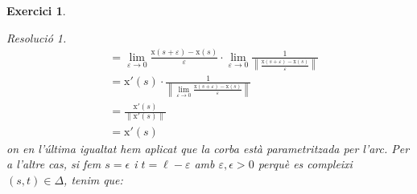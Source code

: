 \documentclass[10pt,a4paper]{article}
\newcommand{\vf}[1]{\boldsymbol{\mathrm{#1}}} %
\newtheorem{exercice}{Exercici}
\theoremstyle{remark}
\newtheorem*{resolution}{Resolució}
\theoremstyle{math}
\begin{document}
\begin{exercice}
\begin{enumerate}
\begin{resolution}
\begin{align*}
                                     & =\lim_{\varepsilon\to 0}\frac{\vf{x}(s+\varepsilon)-\vf{x}(s)}{\varepsilon}\cdot\lim_{\varepsilon\to 0}\frac{1}{\left\|\frac{\vf{x}(s+\varepsilon)-\vf{x}(s)}{\varepsilon}\right\|} \\
                                     & =\vf{x}'(s)\cdot\frac{1}{\left\|\displaystyle\lim_{\varepsilon\to 0}\frac{\vf{x}(s+\varepsilon)-\vf{x}(s)}{\varepsilon}\right\|}                                                    \\
                                     & = \frac{\vf{x}'(s)}{\|\vf{x}'(s)\|}                                                                                                                                                 \\
                                     & = \vf{x}'(s)
            \end{align*}
            on en l'última igualtat hem aplicat que la corba està parametritzada per l'arc. Per a l'altre cas, si fem $s=\epsilon$ i $t=\ell -\varepsilon$ amb $\varepsilon,\epsilon>0$ perquè es compleixi $(s,t)\in\Delta$, tenim que:


\end{resolution}
\end{enumerate}
\end{exercice}
\end{document}
